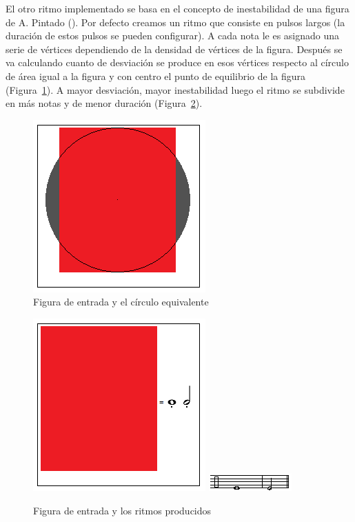 El otro ritmo implementado se basa en el concepto de inestabilidad de una figura de A. Pintado (\cite{portutesis}). Por defecto creamos un ritmo que consiste en pulsos largos (la duración de estos pulsos se pueden configurar). A cada nota le es asignado una serie de vértices dependiendo de la densidad de vértices de la figura. Después se va calculando cuanto de desviación se produce en esos vértices respecto al círculo de área igual a la figura y con centro el punto de equilibrio de la figura (Figura~\ref{fig:Figura2Voz4}). A mayor desviación, mayor inestabilidad luego el ritmo se subdivide en más notas y de menor duración (Figura~\ref{fig:Figura3Voz4}).

		\begin{figure}[htbp]
		\centering
		\hspace*{0.0in}
		\includegraphics[scale=1]{graphics/simpletest2-Circulo.png}
		\caption{Figura de entrada y el círculo equivalente}
		\label{fig:Figura2Voz4}
		\end{figure}

		\begin{figure}[htbp]
		\centering
		\hspace*{0.0in}
		\includegraphics[scale=1]{graphics/simpletest2-F2F3_3.png}
		\includegraphics[scale=1]{graphics/simpletest2-PERpartitura.png}
		\caption{Figura de entrada y los ritmos producidos}
		\label{fig:Figura3Voz4}
		\end{figure}

